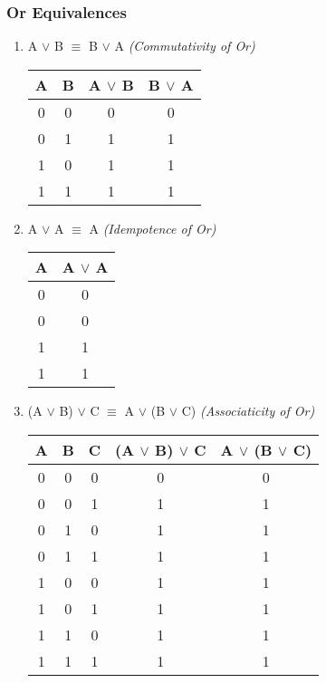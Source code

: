\documentclass[11pt]{article}
\begin{document}
\subsubsection{Or Equivalences}
\begin{enumerate}

  \item A $\lor$ B $\equiv$ B $\lor$ A \emph{(Commutativity of Or)}

\begin{center}
  \begin{tabular}{| c | c | c | c |}
    \hline
    A & B & A $\lor$ B & B $\lor$ A\\ \hline
    0 & 0 & 0 & 0 \\
    0 & 1 & 1 & 1 \\
    1 & 0 & 1 & 1 \\
    1 & 1 & 1 & 1 \\ \hline
  \end{tabular}
\end{center}

\item A $\lor$ A $\equiv$ A \emph{(Idempotence of Or)}

\begin{center}
  \begin{tabular}{| c | c |}
    \hline
    A & A $\lor$ A \\ \hline
    0 & 0 \\
    0 & 0 \\
    1 & 1 \\
    1 & 1 \\ \hline
  \end{tabular}
\end{center}

  \item (A $\lor$ B) $\lor$ C $\equiv$ A $\lor$ (B $\lor$ C) \emph{(Associaticity of Or)}

\begin{center}
  \begin{tabular}{| c | c | c | c | c |}
    \hline
    A & B & C & (A $\lor$ B) $\lor$ C & A $\lor$ (B $\lor$ C) \\ \hline
    0 & 0 & 0 & 0 & 0 \\
    0 & 0 & 1 & 1 & 1 \\
    0 & 1 & 0 & 1 & 1 \\
    0 & 1 & 1 & 1 & 1 \\
    1 & 0 & 0 & 1 & 1 \\
    1 & 0 & 1 & 1 & 1 \\
    1 & 1 & 0 & 1 & 1 \\
    1 & 1 & 1 & 1 & 1 \\ \hline
  \end{tabular}
\end{center}
\end{enumerate}
\end{document}
